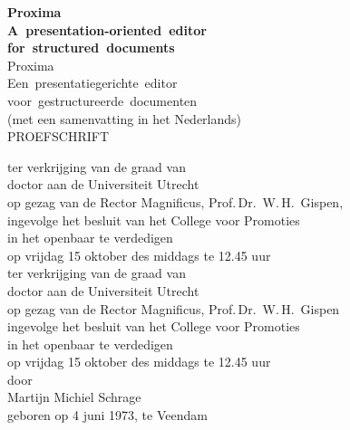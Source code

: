 \newcommand{\engtitle}{Proxima}
\newcommand{\engsubtitle}{A~presentation-oriented~editor\\
for~structured~documents}

\newcommand{\nltitle}{Proxima}
\newcommand{\nlsubtitle}{Een~presentatiegerichte~editor\\
voor~gestructureerde~documenten}

\thispagestyle{empty}

\parbox{141mm}{
\begin{center}
  {\sffamily\bfseries\Huge\engtitle\\
  \vspace{0.1cm}
  \huge\engsubtitle\\}
  \vspace{1cm}
  {\sffamily\huge\nltitle\\
  \vspace{0.1cm}
  \LARGE\nlsubtitle\\}
  \vspace{4mm}
  (met een samenvatting in het Nederlands)\\
  \vspace{1.9cm}
  {\sffamily\Large PROEFSCHRIFT\\}
  
  \vspace{1.8cm}
  ter verkrijging van de graad van\\
  doctor aan de Universiteit Utrecht\\
  op gezag van de Rector Magnificus, Prof.\,Dr.~W.\,H.~Gispen,\\
  ingevolge het besluit van het College voor Promoties\\
  in het openbaar te verdedigen\\
  op vrijdag 15 oktober des middags te 12.45 uur\\
\bc
  ter verkrijging van de graad van\\
  doctor aan de Universiteit Utrecht\\
  op gezag van de Rector Magnificus, Prof.\,Dr.~W.\,H.~Gispen\\
  ingevolge het besluit van het College voor Promoties\\
  in het openbaar te verdedigen\\
  op vrijdag 15 oktober des middags te 12.45 uur\\ \ec
  \vspace{1.1cm} %
  door\\
  \vspace{1.1cm} %
  {\sffamily\Large Martijn Michiel Schrage\\}
  \vspace{1cm}
  geboren op 4 juni 1973, te Veendam
\end{center}
}


